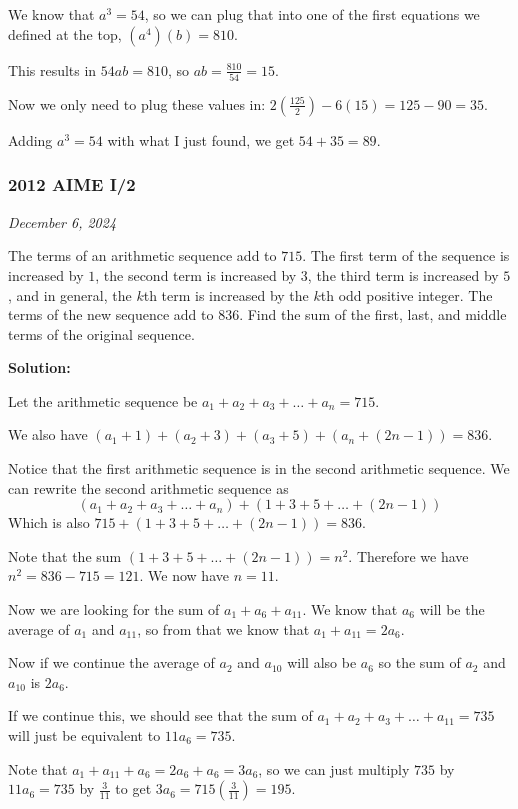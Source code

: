 \documentclass[../mathproblems.tex]{subfiles}
\begin{document}
We know that $a^3=54$, so we can plug that into one of the first equations we defined at the top, $(a^4)(b)=810$.

This results in $54ab=810$, so $ab=\frac{810}{54} = 15$.

Now we only need to plug these values in: $2\left(\frac{125}{2}\right) - 6(15) = 125-90 = 35$.

Adding $a^3 = 54$ with what I just found, we get $54+35 = \boxed{89}$.

\noindent\hrulefill

\subsubsection*{2012 AIME I/2}
\textit{December 6, 2024}

The terms of an arithmetic sequence add to $715$. The first term of the sequence is increased by $1$, the second term is increased by $3$, the third term is increased by $5$, and in general, the $k$th term is increased by the $k$th odd positive integer. The terms of the new sequence add to $836$. Find the sum of the first, last, and middle terms of the original sequence. 

\textbf{Solution:}

Let the arithmetic sequence be $a_1 + a_2 + a_3 + \dots + a_n = 715$.

We also have $(a_1+1) + (a_2 + 3) + (a_3 + 5) + (a_n+(2n-1)) = 836$.

Notice that the first arithmetic sequence is in the second arithmetic sequence. We can rewrite the second arithmetic sequence as 
\[ (a_1 + a_2 + a_3 + \dots + a_n) + (1 + 3 + 5 + \dots + (2n-1))\]
Which is also $715 + (1+3+5+\dots+(2n-1))=836$.

Note that the sum $(1+3+5+\dots+(2n-1))=n^2$. Therefore we have $n^2 = 836-715 = 121$. We now have $n=11$.

Now we are looking for the sum of $a_1+a_6+a_{11}$. We know that $a_6$ will be the average of $a_1$ and $a_{11}$, so from that we know that $a_1+a_{11} = 2a_6$.

Now if we continue the average of $a_2$ and $a_{10}$ will also be $a_6$ so the sum of $a_2$ and $a_{10}$ is $2a_6$.

If we continue this, we should see that the sum of $a_1 + a_2 + a_3 + \dots + a_{11} = 735$ will just be equivalent to $11a_6 = 735$. 

Note that $a_1+a_{11}+a_6 = 2a_6 + a_6 = 3a_6$, so we can just multiply $735$ by $11a_6=735$ by $\frac{3}{11}$ to get $3a_6=715\left(\frac{3}{11}\right) = \boxed{195}$.
\end{document}
